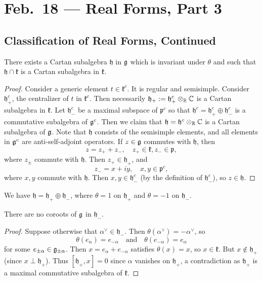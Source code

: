 \chapter{Feb.~18 --- Real Forms, Part 3}

\section{Classification of Real Forms, Continued}

\begin{prop}
  There exists a Cartan subalgebra
  $\mathfrak{h}$ in $\mathfrak{g}$ which is invariant
  under $\theta$ and such that
  $\mathfrak{h} \cap \mathfrak{k}$
  is a Cartan subalgebra in $\mathfrak{k}$.
\end{prop}

\begin{proof}
  Consider a generic element
  $t \in \mathfrak{k}^c$. It is regular and
  semisimple. Consider
  $\mathfrak{h}^c_+$, the centralizer
  of $t$ in $\mathfrak{k}^c$. Then
  necessarily $\mathfrak{h}_+ := \mathfrak{h}^c_+ \otimes_{\mathbb{R}} \mathbb{C}$
  is a Cartan subalgebra in $\mathfrak{k}$.
  Let $\mathfrak{h}^c_-$ be a maximal
  subspace of $\mathfrak{p}^c$ so that
  $\mathfrak{h}^c = \mathfrak{h}^c_+ \oplus \mathfrak{h}_-^c$
  is a commutative subalgebra of
  $\mathfrak{g}^c$.
  Then we claim that $\mathfrak{h} = \mathfrak{h}^c \otimes_{\mathbb{R}} \mathbb{C}$
  is a Cartan subalgebra of $\mathfrak{g}$.
  Note that $\mathfrak{h}$ consists of
  the semisimple elements, and all
  elements in $\mathfrak{g}^c$ are
  anti-self-adjoint operators.
  If $z \in \mathfrak{g}$ commutes with
  $\mathfrak{h}$, then
  \[
    z = z_+ + z_-, \quad z_+ \in \mathfrak{k}, z_- \in \mathfrak{p},
  \]
  where $z_\pm$ commute with $\mathfrak{h}$.
  Then $z_+ \in \mathfrak{h}_+$, and
  \[
    z_- = x + iy, \quad x, y \in \mathfrak{p}^c,
  \]
  where $x, y$ commute with
  $\mathfrak{h}$. Then
  $x, y \in \mathfrak{h}^c_-$ (by the
  definition of $\mathfrak{h}^c_-$),
  so $z \in \mathfrak{h}$.
\end{proof}

\begin{corollary}
  We have
  $\mathfrak{h} = \mathfrak{h}_+ \oplus \mathfrak{h}_-$, where
  $\theta = 1$ on $\mathfrak{h}_+$ and
  $\theta = -1$ on $\mathfrak{h}_-$.
\end{corollary}

\begin{lemma}
  There are no coroots of $\mathfrak{g}$ in
  $\mathfrak{h}_-$.
\end{lemma}

\begin{proof}
  Suppose otherwise
  that $\alpha^\vee \in \mathfrak{h}_-$.
  Then $\theta(\alpha^\vee) = -\alpha^\vee$,
  so
  \[
    \theta(e_\alpha) = e_{-\alpha}
    \quad \text{and} \quad
    \theta(e_{-\alpha}) = e_\alpha
  \]
  for some $e_{\pm \alpha} \in \mathfrak{g}_{\pm \alpha}$.
  Then $x = e_{\alpha} + e_{-\alpha}$
  satisfies $\theta(x) = x$, so
  $x \in \mathfrak{k}$. But
  $x \notin \mathfrak{h}_+$ (since
  $x \perp \mathfrak{h}_+$).
  Thus $[\mathfrak{h}_+, x] = 0$
  since $\alpha$ vanishes on
  $\mathfrak{h}_+$, a contradiction as
  $\mathfrak{h}_+$ is a maximal commutative
  subalgebra of $\mathfrak{k}$.
\end{proof}

